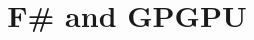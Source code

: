 \documentclass{sig-alternate-05-2015}
\begin{document}
%

\title{F\# and GPGPU}
%
%
%
%
%
\end{document}
